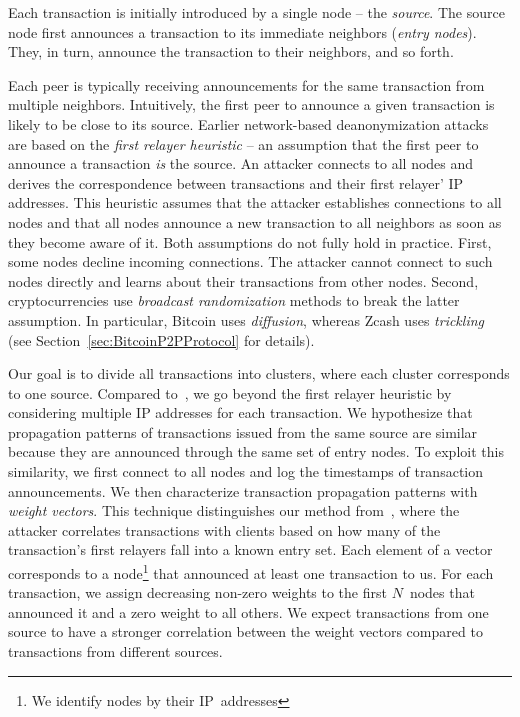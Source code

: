 Each transaction is initially introduced by a single node -- the \textit{source}.
The source node first announces a transaction to its immediate neighbors (\textit{entry nodes}).
They, in turn, announce the transaction to their neighbors, and so forth.

Each peer is typically receiving announcements for the same transaction from multiple neighbors.
Intuitively, the first peer to announce a given transaction is likely to be close to its source.
Earlier network-based deanonymization attacks~\cite{Biryukov2014, Koshy2014} are based on the \textit{first relayer heuristic} -- an assumption that the first peer to announce a transaction \textit{is} the source.
An attacker connects to all nodes and derives the correspondence between transactions and their first relayer' IP addresses.
This heuristic assumes that the attacker establishes connections to all nodes and that all nodes announce a new transaction to all neighbors as soon as they become aware of it.
Both assumptions do not fully hold in practice.
First, some nodes decline incoming connections.
The attacker cannot connect to such nodes directly and learns about their transactions from other nodes.
Second, cryptocurrencies use \textit{broadcast randomization} methods to break the latter assumption.
In particular, Bitcoin uses \textit{diffusion}, whereas Zcash uses \textit{trickling} (see Section~\ref{sec:BitcoinP2PProtocol} for details).

Our goal is to divide all transactions into clusters, where each cluster corresponds to one source.
Compared to~\cite{Koshy2014}, we go beyond the first relayer heuristic by considering multiple IP addresses for each transaction.
We hypothesize that propagation patterns of transactions issued from the same source are similar because they are announced through the same set of entry nodes.
To exploit this similarity, we first connect to all nodes and log the timestamps of transaction announcements.
We then characterize transaction propagation patterns with \textit{weight vectors}.
This technique distinguishes our method from~\cite{Biryukov2014}, where the attacker correlates transactions with clients based on how many of the transaction's first relayers fall into a known entry set.
Each element of a vector corresponds to a node\footnote{We identify nodes by their IP~addresses} that announced at least one transaction to us.
For each transaction, we assign decreasing non-zero weights to the first $N$~nodes that announced it and a zero weight to all others.
We expect transactions from one source to have a stronger correlation between the weight vectors compared to transactions from different sources.

